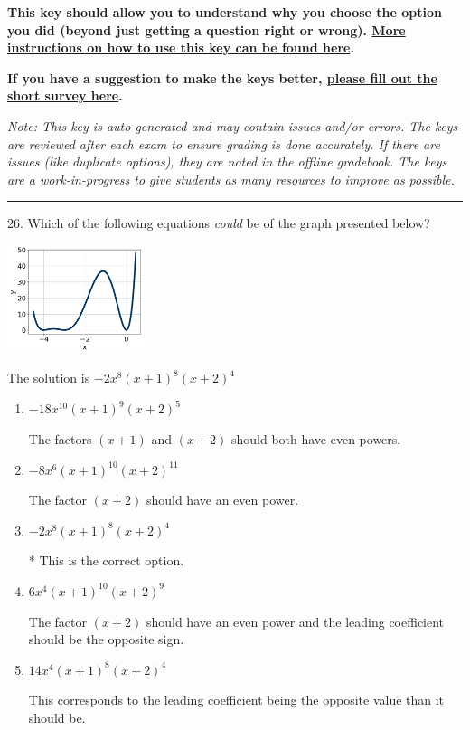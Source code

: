 \documentclass{article}[14pt]
\begin{document}
\textbf{This key should allow you to understand why you choose the option you did (beyond just getting a question right or wrong). \href{https://xronos.clas.ufl.edu/mac1105spring2020/courseDescriptionAndMisc/Exams/LearningFromResults}{More instructions on how to use this key can be found here}.}

\textbf{If you have a suggestion to make the keys better, \href{https://forms.gle/CZkbZmPbC9XALEE88}{please fill out the short survey here}.}

\textit{Note: This key is auto-generated and may contain issues and/or errors. The keys are reviewed after each exam to ensure grading is done accurately. If there are issues (like duplicate options), they are noted in the offline gradebook. The keys are a work-in-progress to give students as many resources to improve as possible.}

\rule{\textwidth}{0.4pt}

26. Which of the following equations \textit{could} be of the graph presented below?
\begin{center} \includegraphics[width=0.3\textwidth]{../Figures/polyGraphToFunctionC.png} \end{center} 

The solution is $ -2x^{8} (x + 1)^{8} (x + 2)^{4} $ 

\begin{enumerate}[label=\Alph*.] 
\item $ -18x^{10} (x + 1)^{9} (x + 2)^{5} $ 

 The factors $(x + 1)$ and $(x + 2)$ should both have even powers. 
\item $ -8x^{6} (x + 1)^{10} (x + 2)^{11} $ 

 The factor $(x + 2)$ should have an even power. 
\item $ -2x^{8} (x + 1)^{8} (x + 2)^{4} $ 

 * This is the correct option. 
\item $ 6x^{4} (x + 1)^{10} (x + 2)^{9} $ 

 The factor $(x + 2)$ should have an even power and the leading coefficient should be the opposite sign. 
\item $ 14x^{4} (x + 1)^{8} (x + 2)^{4} $ 

 This corresponds to the leading coefficient being the opposite value than it should be. 
\end{enumerate} 
 
\end{document}
